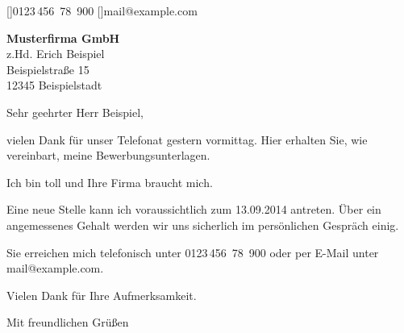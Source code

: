 \documentclass[a4paper, parskip=full*, fromalign=right, fromphone, fromemail]{scrlttr2}
\begin{document}
\pagestyle{plain}
[\Telefon\enskip]{0123\,456~78~900}
[\Email\enskip]{mail@example.com}
\begin{letter}{\textbf{Musterfirma GmbH}\\z.Hd. Erich Beispiel\\Beispielstraße 15\\12345 Beispielstadt} 
\opening{Sehr geehrter Herr Beispiel,} 
vielen Dank für unser Telefonat gestern vormittag. Hier erhalten Sie, wie vereinbart, meine Bewerbungsunterlagen.

Ich bin toll und Ihre Firma braucht mich.

Eine neue Stelle kann ich voraussichtlich zum 13.09.2014 antreten. Über ein angemessenes Gehalt werden wir uns sicherlich im persönlichen Gespräch einig.

Sie erreichen mich telefonisch unter 0123\,456~78~900 oder per E-Mail unter mail@example.com.

Vielen Dank für Ihre Aufmerksamkeit.

\closing{Mit freundlichen Grüßen}
\end{letter} 
\end{document}
